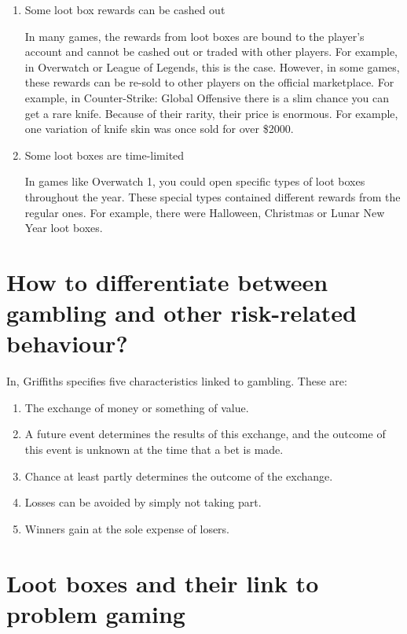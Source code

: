 \documentclass[10pt,twoside,english,a4paper]{coursepaper}
\begin{document}
\begin{enumerate}
\item Some loot box rewards can be cashed out

	In many games, the rewards from loot boxes are bound to the player's account and cannot be cashed out or traded with other players. For example, in Overwatch or League of Legends, this is the case. However, in some games, these rewards can be re-sold to other players on the official marketplace. For example, in Counter-Strike: Global Offensive there is a slim chance you can get a rare knife. Because of their rarity, their price is enormous. For example, one variation of knife skin was once sold for over \$2000. \cite{csgo:knives}

\item Some loot boxes are time-limited
	
	In games like Overwatch 1, you could open specific types of loot boxes throughout the year. These special types contained different rewards from the regular ones. For example, there were Halloween, Christmas or Lunar New Year loot boxes. 

\end{enumerate}

\section{How to differentiate between gambling and other risk-related behaviour?} \label{sec:griffiths}

In\cite{gambling:characteristics}, Griffiths specifies five characteristics linked to gambling. These are:

\begin{enumerate}

\item The exchange of money or something of value.
\item A future event determines the results of this exchange, and the outcome of this event is unknown at the time that a bet is made.
\item Chance at least partly determines the outcome of the exchange.
\item Losses can be avoided by simply not taking part.
\item Winners gain at the sole expense of losers.

\end{enumerate}
	

\section{Loot boxes and their link to problem gaming} \label{sec:link}
\end{document}
